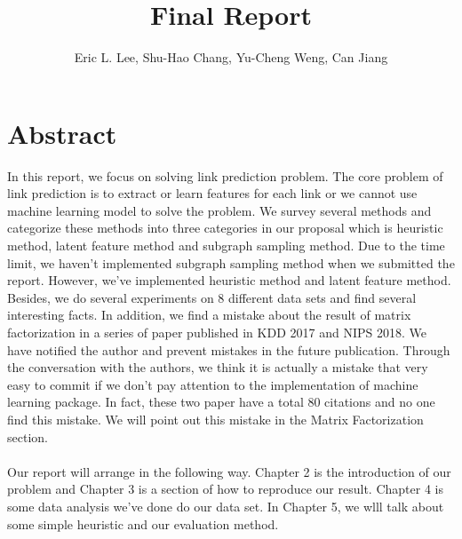 \documentclass[12pt]{article}
\begin{document}
 
\title{Final Report}
\author{Eric L. Lee, Shu-Hao Chang, Yu-Cheng Weng, Can Jiang} 
\maketitle

\section{Abstract}

In this report, we focus on solving link prediction problem. The core problem of link prediction is to extract or learn features for each link or we cannot use machine learning model to solve the problem. We survey several methods and categorize these methods into three categories in our proposal which is heuristic method, latent feature method and subgraph sampling method.
Due to the time limit, we haven't implemented subgraph sampling method when we submitted the report. However, we've implemented heuristic method and latent feature method. Besides, we do several experiments on 8 different data sets and find several interesting facts. In addition, we find a mistake about the result of matrix factorization in a series of paper published in KDD 2017 and NIPS 2018. We have notified the author and prevent mistakes in the future publication. Through the conversation with the authors, we think it is actually a mistake that very easy to commit if we don't pay attention to the implementation of machine learning package. In fact, these two paper have a total 80 citations and no one find this mistake. We will point out this mistake in the Matrix Factorization section.
\\ \\
Our report will arrange in the following way. Chapter 2 is the introduction of our problem and Chapter 3 is a section of how to reproduce our result. Chapter 4 is some data analysis we've done do our data set. In Chapter 5, we wlll talk about some simple heuristic and our evaluation method. 
\end{document}
